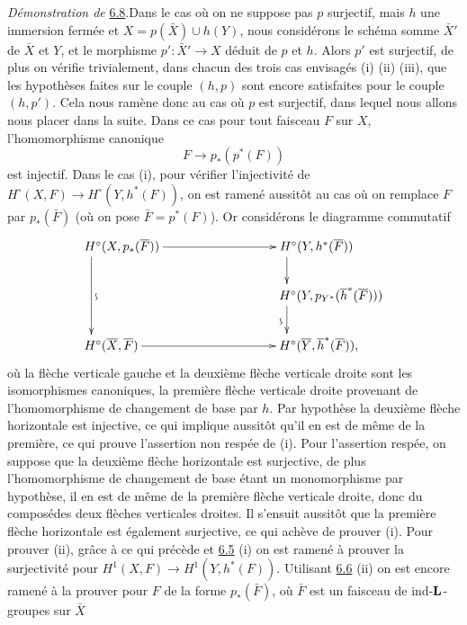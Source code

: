 \documentclass[10pt]{../fichiers-configuration-latex/smfart}
\begin{document}
\noindent
\emph{Démonstration de} \hyperref[XII.prop6.8]{6.8}.\pageoriginale Dans le cas où on ne
suppose pas $p$ surjectif, mais $h$ une immersion fermée et
$X=p(\bar{X})\cup h(Y)$, nous considérons le schéma somme $\bar{X}'$
de $\bar{X}$ et $Y$, et le morphisme $p':\bar{X}'\rightarrow X$ déduit
de $p$ et $h$. Alors $p'$ est surjectif, de plus on vérifie
trivialement, dans chacun des trois cas envisagés (i) (ii) (iii), que
les hypothèses faites sur le couple $(h,p)$ sont encore satisfaites
pour le couple $(h,p')$. Cela nous ramène donc au cas où $p$ est
surjectif, dans lequel nous allons nous placer dans la suite. Dans ce
cas pour tout faisceau $F$ sur $X$, l'homomorphisme canonique
$$
F\longrightarrow p_{\ast}(p^{\ast}(F))
$$
est injectif. Dans le cas (i), pour vérifier l'injectivité de
$H^{\circ}(X,F)\rightarrow H^{\circ}(Y,h^{\ast}(F))$, on est ramené
aussitôt au cas où on remplace $F$ par $p_{\ast}(\bar{F})$ (où on pose
$\bar{F}=p^{\ast}(F)$). Or considérons le diagramme commutatif
$$
\xymatrix@C=2.75cm@R=.75cm{
**[r]H^{\circ}(X,p_{\ast}(\bar{F})) \ar[dd]^{\text{\rotatebox{90}{$\backsim$}}} \ar[r]& **[r]H^{\circ}(Y,h^{\ast}(\bar{F})) \ar[d]\\
                           &**[r]H^{\circ}(Y,p_{Y^{\ast}}(\bar{h}^{\ast}(\bar{F})))\ar[d]_{\text{\rotatebox{90}{$\backsim$}}}\\
**[r]H^{\circ}(\bar{X},\bar{F})  \ar[r] &
                           **[r]H^{\circ}(\bar{Y},\bar{h}^{\ast}(\bar{F})),  
}
$$
où la flèche verticale gauche et la deuxième flèche verticale droite
sont les isomorphismes canoniques, la première flèche verticale droite
provenant de l'homomorphisme de changement de base par $h$. Par
hypothèse la deuxième flèche horizontale est injective, ce qui
implique aussitôt qu'il en est de même de la première, ce qui prouve
l'assertion non respée de (i). Pour l'assertion respée, on suppose que
la deuxième flèche horizontale est surjective, de plus l'homomorphisme
de changement de base étant un monomorphisme par hypothèse, il en est
de même de la première flèche verticale droite, donc du
composé\pageoriginale des deux flèches verticales droites. Il s'ensuit
aussitôt que la première flèche horizontale est également surjective,
ce qui achève de prouver (i). Pour prouver (ii), grâce à ce qui
précède et \hyperref[XII.prop6.5]{6.5} (i) on est ramené à prouver la surjectivité pour
$H^1(X,F)\rightarrow H^1(Y,h^{\ast}(F))$. Utilisant \hyperref[XII.cor6.6]{6.6} (ii) on est
encore ramené à la prouver pour $F$ de la forme $p_{\ast}(\bar{F})$,
où $\bar{F}$ est un faisceau de ind-$\mathbf{L}$-groupes sur $\bar{X}$
\end{document}
